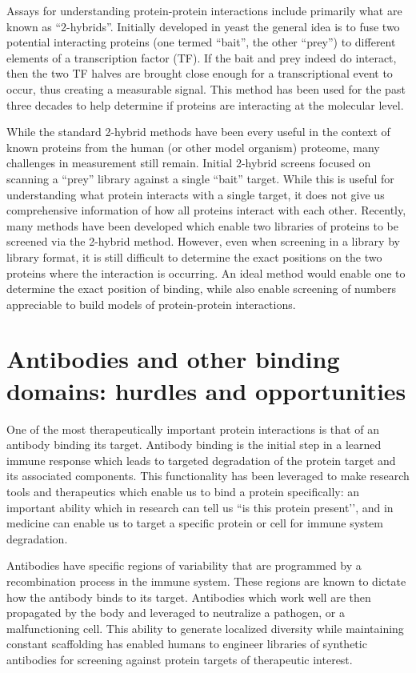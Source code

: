 Assays for understanding protein-protein interactions include primarily what are known as “2-hybrids”. Initially developed in yeast\cite{Fields1989-to} the general idea is to fuse two potential interacting proteins (one termed “bait”, the other “prey”) to different elements of a transcription factor (TF). If the bait and prey indeed do interact, then the two TF halves are brought close enough for a transcriptional event to occur, thus creating a measurable signal. This method has been used for the past three decades to help determine if proteins are interacting at the molecular level. 

While the standard 2-hybrid methods have been every useful in the context of known proteins from the human (or other model organism) proteome, many challenges in measurement still remain. Initial 2-hybrid screens focused on scanning a “prey” library against a single “bait” target. While this is useful for understanding what protein interacts with a single target, it does not give us comprehensive information of how all proteins interact with each other. Recently, many methods have been developed which enable two libraries of proteins to be screened via the 2-hybrid method\cite{Yachie2016-ss,Younger2017-as,Trigg2017-hz}. However, even when screening in a library by library format, it is still difficult to determine the exact positions on the two proteins where the interaction is occurring. An ideal method would enable one to determine the exact position of binding, while also enable screening of numbers appreciable to build models of protein-protein interactions.

\section{Antibodies and other binding domains: hurdles and opportunities}

One of the most therapeutically important protein interactions is that of an antibody binding its target\cite{Nelson2010-aj}. Antibody binding is the initial step in a learned immune response which leads to targeted degradation of the protein target and its associated components\cite{Weiner2007-yj}. This functionality has been leveraged to make research tools and therapeutics  which enable us to bind a protein specifically: an important ability which in research can tell us ``is this protein present’’, and in medicine can enable us to target a specific protein or cell for immune system degradation.

Antibodies have specific regions of variability that are programmed by a recombination process in the immune system\cite{Tonegawa1983-hs}. These regions are known to dictate how the antibody binds to its target. Antibodies which work well are then propagated by the body and leveraged to neutralize a pathogen, or a malfunctioning cell. This ability to generate localized diversity while maintaining constant scaffolding has enabled humans to engineer libraries of synthetic antibodies for screening against protein targets of therapeutic interest.


